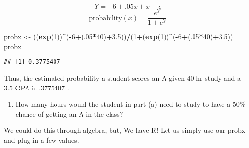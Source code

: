 \documentclass[]{article}
\newenvironment{Shaded}{\begin{snugshade}}{\end{snugshade}}
\newcommand{\KeywordTok}[1]{\textcolor[rgb]{0.13,0.29,0.53}{\textbf{#1}}}
\newcommand{\DecValTok}[1]{\textcolor[rgb]{0.00,0.00,0.81}{#1}}
\newcommand{\FloatTok}[1]{\textcolor[rgb]{0.00,0.00,0.81}{#1}}
\newcommand{\StringTok}[1]{\textcolor[rgb]{0.31,0.60,0.02}{#1}}
\newcommand{\OperatorTok}[1]{\textcolor[rgb]{0.81,0.36,0.00}{\textbf{#1}}}
\newcommand{\NormalTok}[1]{#1}
\providecommand{\tightlist}{%
  \setlength{\itemsep}{0pt}\setlength{\parskip}{0pt}}
\begin{document}
\[ Y=-6+.05x+x+\epsilon \]
\[ \text{probability}(x) = \frac{e^Y}{1+e^Y} \]

\begin{Shaded}
\begin{Highlighting}[]
\NormalTok{probx <-}\StringTok{ }\NormalTok{((}\KeywordTok{exp}\NormalTok{(}\DecValTok{1}\NormalTok{))}\OperatorTok{^}\NormalTok{(}\OperatorTok{-}\DecValTok{6}\OperatorTok{+}\NormalTok{(.}\DecValTok{05}\OperatorTok{*}\DecValTok{40}\NormalTok{)}\OperatorTok{+}\FloatTok{3.5}\NormalTok{))}\OperatorTok{/}\NormalTok{(}\DecValTok{1}\OperatorTok{+}\NormalTok{(}\KeywordTok{exp}\NormalTok{(}\DecValTok{1}\NormalTok{))}\OperatorTok{^}\NormalTok{(}\OperatorTok{-}\DecValTok{6}\OperatorTok{+}\NormalTok{(.}\DecValTok{05}\OperatorTok{*}\DecValTok{40}\NormalTok{)}\OperatorTok{+}\FloatTok{3.5}\NormalTok{))}
\NormalTok{probx}
\end{Highlighting}
\end{Shaded}

\begin{verbatim}
## [1] 0.3775407
\end{verbatim}

Thus, the estimated probability a student scores an A given 40 hr study
and a 3.5 GPA is .3775407 .

\begin{enumerate}
\def\labelenumi{(\alph{enumi})}
\setcounter{enumi}{1}
\tightlist
\item
  How many hours would the student in part (a) need to study to have a
  50\% chance of getting an A in the class?
\end{enumerate}

We could do this through algebra, but, We have R! Let us simply use our
probx and plug in a few values.
\end{document}
